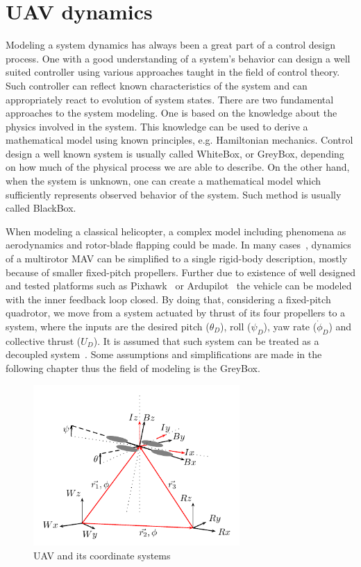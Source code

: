 \section{UAV dynamics}

Modeling a system dynamics has always been a great part of a control design process. One with a good understanding of a system's behavior can design a well suited controller using various approaches taught in the field of control theory. Such controller can reflect known characteristics of the system and can appropriately react to evolution of system states. There are two fundamental approaches to the system modeling. One is based on the knowledge about the physics involved in the system. This knowledge can be used to derive a mathematical model using known principles, e.g. Hamiltonian mechanics. Control design a well known system is usually called WhiteBox, or GreyBox, depending on how much of the physical process we are able to describe. On the other hand, when the system is unknown, one can create a mathematical model which sufficiently represents observed behavior of the system. Such method is usually called BlackBox.

When modeling a classical helicopter, a complex model including phenomena as aerodynamics and rotor-blade flapping could be made. In many cases~\citep{alexis2014robust}\citep{mahony2012multirotor}, dynamics of a multirotor MAV can be simplified to a single rigid-body description, mostly because of smaller fixed-pitch propellers. Further due to existence of well designed and tested platforms such as Pixhawk~\citep{pixhawk} or Ardupilot~\citep{ardupilot} the vehicle can be modeled with the inner feedback loop closed. By doing that, considering a fixed-pitch quadrotor, we move from a system actuated by thrust of its four propellers to a system, where the inputs are the desired pitch ($\theta_D$), roll ($\psi_D$), yaw rate ($\dot{\phi}_D$) and collective thrust ($U_D$). It is assumed that such system can be treated as a decoupled system~\citep{mahony2012multirotor}. Some assumptions and simplifications are made in the following chapter thus the field of modeling is the GreyBox.


\begin{figure}[!h]
\centering
\includegraphics[width=0.7\textwidth]{fig/coordinate_system.pdf}
\caption{UAV and its coordinate systems}
\label{fig:coordinate_system}
\end{figure}

